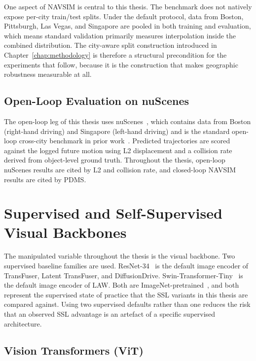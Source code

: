 One aspect of NAVSIM is central to this thesis. The benchmark does not natively expose per-city train/test splits. Under the default protocol, data from Boston, Pittsburgh, Las Vegas, and Singapore are pooled in both training and evaluation, which means standard validation primarily measures interpolation inside the combined distribution. The city-aware split construction introduced in Chapter~\ref{chap:methodology} is therefore a structural precondition for the experiments that follow, because it is the construction that makes geographic robustness measurable at all.

\subsection{Open-Loop Evaluation on nuScenes}
\label{sec:bg-nuscenes-ol}

The open-loop leg of this thesis uses nuScenes~\cite{caesar-nuscenes-2020}, which contains data from Boston (right-hand driving) and Singapore (left-hand driving) and is the standard open-loop cross-city benchmark in prior work~\cite{zhai-rethinking-2023,li-law-2024}. Predicted trajectories are scored against the logged future motion using L2 displacement and a collision rate derived from object-level ground truth. Throughout the thesis, open-loop nuScenes results are cited by L2 and collision rate, and closed-loop NAVSIM results are cited by PDMS.

\section{Supervised and Self-Supervised Visual Backbones}
\label{sec:bg-backbones}

The manipulated variable throughout the thesis is the visual backbone. Two supervised baseline families are used. ResNet-34~\cite{he-resnet-2016} is the default image encoder of TransFuser, Latent TransFuser, and DiffusionDrive. Swin-Transformer-Tiny~\cite{liu-swin-2021} is the default image encoder of LAW. Both are ImageNet-pretrained~\cite{deng-imagenet-2009}, and both represent the supervised state of practice that the SSL variants in this thesis are compared against. Using two supervised defaults rather than one reduces the risk that an observed SSL advantage is an artefact of a specific supervised architecture.

\subsection{Vision Transformers (ViT)}
\label{sec:bg-vit}

